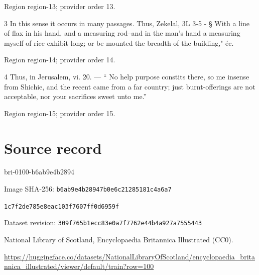 \documentclass[11pt]{article}
\begin{document}
{\scriptsize\color{gray} Region region-13; provider order 13.\par}
\medskip

3 In this sense it occurs in many passages. Thus, Zekelal, 3L 3-5 - § With a line of flax in his hand, and a measuring rod--and in the man’s hand a measuring myself of rice exhibit long; or be mounted the breadth of the building," éc.
\par

{\scriptsize\color{gray} Region region-14; provider order 14.\par}
\medskip

4 Thus, in Jerusalem, vi. 20. — “ No help purpose constits there, so me insense from Shichie, and the recent came from a far country; just burnt-offerings are not acceptable, nor your sacrifices sweet unto me.”
\par

{\scriptsize\color{gray} Region region-15; provider order 15.\par}
\medskip
\newpage\section*{Source record}
bri-0100-b6ab9e4b2894\par
Image SHA-256: \texttt{b6ab9e4b28947b0e6c21285181c4a6a7}\par\texttt{1c7f2de785e8eac103f7607ff0d6959f}\par
Dataset revision: \texttt{309f765b1ecc83e0a7f7}\texttt{762e44b4a927a7555443}\par
National Library of Scotland, Encyclopaedia Britannica Illustrated (CC0).\par
\url{https://huggingface.co/datasets/NationalLibraryOfScotland/encyclopaedia_britannica_illustrated/viewer/default/train?row=100}
\end{document}
